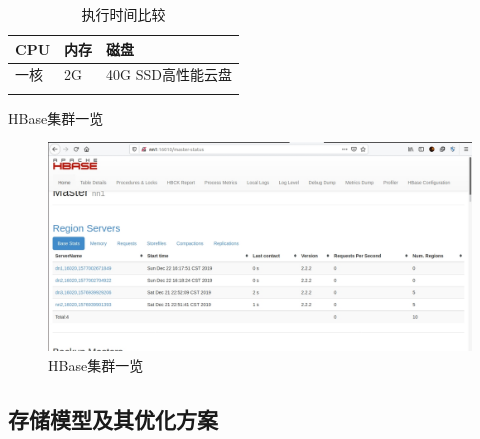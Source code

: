\documentclass{ctexrep}
\begin{document}
	\begin{longtable}{l|p{5cm}|l}
		\hline
		CPU & 内存 & 磁盘\\
		\hline
		\hline
		一核 &2G & 40G SSD高性能云盘\\
		\hline
		\caption{执行时间比较}
	\end{longtable}
	HBase集群一览
	\begin{figure}[H]
		\centering
		\includegraphics[width=0.7\linewidth]{img/HBase_cluster.jpg}
		\caption{HBase集群一览}
		\label{fig:HBase_cluster}
	\end{figure}
	\subsection{存储模型及其优化方案}
\end{document}
